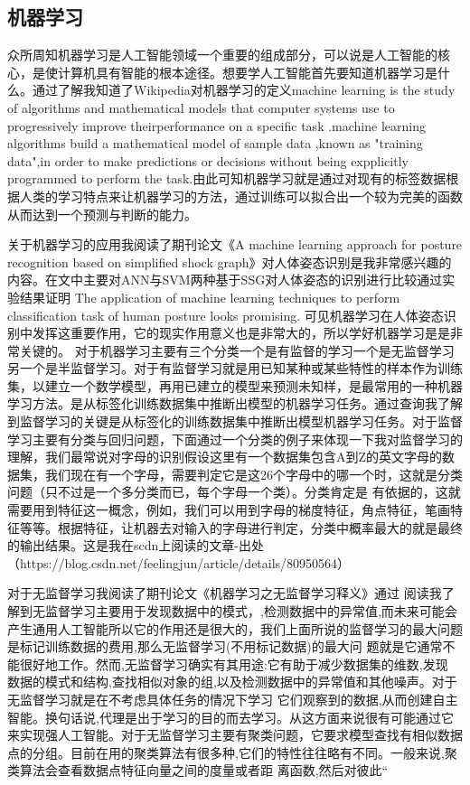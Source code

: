 \documentclass{article}
\begin{document}
\subsection{机器学习}
众所周知机器学习是人工智能领域一个重要的组成部分，可以说是人工智能的核心，是使计算机具有智能的根本途径。想要学人工智能首先要知道机器学习是什么。通过了解我知道了Wikipedia对机器学习的定义machine learning is the study of algorithms and mathematical models that computer systems use to progressively improve theirperformance on a specific task .machine learning algorithms build a mathematical model of sample data ,known as "training data",in order to make predictions or decisions without being expplicitly programmed to perform the task.由此可知机器学习就是通过对现有的标签数据根据人类的学习特点来让机器学习的方法，通过训练可以拟合出一个较为完美的函数从而达到一个预测与判断的能力。\par
关于机器学习的应用我阅读了期刊论文《A machine learning approach for posture recognition based on simplified shock graph》\citep{Nooritawati2009A}对人体姿态识别是我非常感兴趣的内容。在文中主要对ANN与SVM两种基于SSG对人体姿态的识别进行比较通过实验结果证明 The application of machine learning techniques to perform classification task of human posture looks promising. 可见机器学习在人体姿态识别中发挥这重要作用，它的现实作用意义也是非常大的，所以学好机器学习是是非常关键的。
对于机器学习主要有三个分类一个是有监督的学习一个是无监督学习另一个是半监督学习。对于有监督学习就是用已知某种或某些特性的样本作为训练集，以建立一个数学模型，再用已建立的模型来预测未知样，是最常用的一种机器学习方法。是从标签化训练数据集中推断出模型的机器学习任务。通过查询我了解到监督学习的关键是从标签化的训练数据集中推断出模型机器学习任务。对于监督学习主要有分类与回归问题，下面通过一个分类的例子来体现一下我对监督学习的理解，我们最常说对字母的识别假设这里有一个数据集包含A到Z的英文字母的数据集，我们现在有一个字母，需要判定它是这26个字母中的哪一个时，这就是分类问题（只不过是一个多分类而已，每个字母一个类）。分类肯定是
有依据的，这就需要用到特征这一概念，例如，我们可以用到字母的梯度特征，角点特征，笔画特征等等。根据特征，让机器去对输入的字母进行判定，分类中概率最大的就是最终的输出结果。这是我在scdn上阅读的文章-出处（https://blog.csdn.net/feelingjun/article/details/80950564）\par
对于无监督学习我阅读了期刊论文《机器学习之无监督学习释义》\citep{wujianduxuexi}通过
阅读我了解到无监督学习主要用于发现数据中的模式，,检测数据中的异常值,而未来可能会产生通用人工智能所以它的作用还是很大的，我们上面所说的监督学习的最大问题是标记训练数据的费用,那么无监督学习(不用标记数据)的最大问 题就是它通常不能很好地工作。然而,无监督学习确实有其用途:它有助于减少数据集的维数,发现 数据的模式和结构,查找相似对象的组,以及检测数据中的异常值和其他噪声。对于无监督学习就是在不考虑具体任务的情况下学习 它们观察到的数据,从而创建自主智能。换句话说,代理是出于学习的目的而去学习。从这方面来说很有可能通过它来实现强人工智能。对于无监督学习主要有聚类问题，它要求模型查找有相似数据点的分组。目前在用的聚类算法有很多种,它们的特性往往略有不同。一般来说,聚类算法会查看数据点特征向量之间的度量或者距 离函数,然后对彼此“
\end{document}
